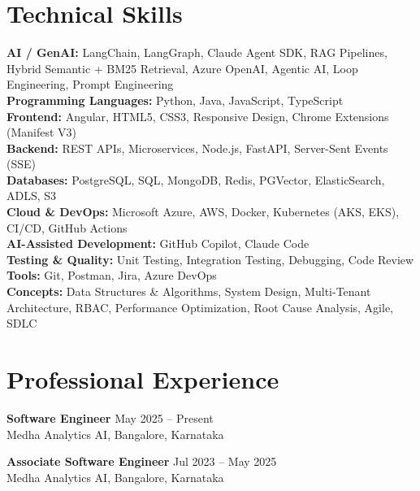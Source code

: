 \documentclass[10pt,letterpaper]{article}
\newcommand{\role}[2]{\textbf{#1} \hfill #2\\[-3pt]}
\begin{document}
\section*{Technical Skills}
\textbf{AI / GenAI:} LangChain, LangGraph, Claude Agent SDK, RAG Pipelines, Hybrid Semantic + BM25 Retrieval, Azure OpenAI, Agentic AI, Loop Engineering, Prompt Engineering\\
\textbf{Programming Languages:} Python, Java, JavaScript, TypeScript\\
\textbf{Frontend:} Angular, HTML5, CSS3, Responsive Design, Chrome Extensions (Manifest V3)\\
\textbf{Backend:} REST APIs, Microservices, Node.js, FastAPI, Server-Sent Events (SSE)\\
\textbf{Databases:} PostgreSQL, SQL, MongoDB, Redis, PGVector, ElasticSearch, ADLS, S3\\
\textbf{Cloud \& DevOps:} Microsoft Azure, AWS, Docker, Kubernetes (AKS, EKS), CI/CD, GitHub Actions\\
\textbf{AI-Assisted Development:} GitHub Copilot, Claude Code\\
\textbf{Testing \& Quality:} Unit Testing, Integration Testing, Debugging, Code Review\\
\textbf{Tools:} Git, Postman, Jira, Azure DevOps\\
\textbf{Concepts:} Data Structures \& Algorithms, System Design, Multi-Tenant Architecture, RBAC, Performance Optimization, Root Cause Analysis, Agile, SDLC

\section*{Professional Experience}

\role{Software Engineer}{May 2025 -- Present}
Medha Analytics AI, Bangalore, Karnataka

\role{Associate Software Engineer}{Jul 2023 -- May 2025}
Medha Analytics AI, Bangalore, Karnataka
\end{document}
